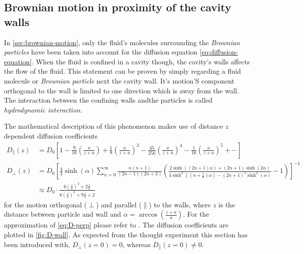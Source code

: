 \documentclass[.../bericht]{subfilies}
\begin{document}
      \subsection{Brownian motion in proximity of the cavity walls}
      \label{subsec:brownian-wall}

        In \cref{sec:brownian-motion}, only the fluid's molecules surrounding the \textit{Brownian particles} have been taken into account for the diffusion equation \cref{eq:diffusion-equation}. When the fluid is confined in a cavity though, the cavity's walls affects the flow of the fluid. This statement can be proven by simply regarding a fluid molecule or \textit{Brownian particle} next the cavity wall. It's motion'S component orthogonal to the wall is limited to one direction which is away from the wall. The interaction between the confining walls andthe particles is called \textit{hydrodynamic interaction}.

        The mathematical description of this phenomenon makes use of distance $z$ dependent diffusion coefficients
        \begin{align}
          D_\parallel(z)&=D_0\left[ 1- \frac{9}{16} \left( \frac{a}{z+a}\right) + \frac{1}{8} \left( \frac{a}{z+a}\right)^3 - \frac{45}{256}\left( \frac{a}{z+a}\right)^4- \frac{1}{16}\left( \frac{a}{z+a}\right)^5+\cdots \right] \label{eq:D-parallel} \\
          D_\perp(z)&=D_0\left[ \frac{4}{3}\sinh (\alpha ) \sum_{n=0}^{\infty} \frac{n(n+1)}{(2n-1)(2n+3)}\left( \frac{2\sinh ((2n+1)\alpha )+(2n+1)\sinh (2\alpha )}{4\sinh^2 ((n+ \frac{1}{2})\alpha)-(2n+1)^2 \sinh^2 (\alpha )} - 1 \right) \right]^{-1} \nonumber \\
          &\approx D_0\cdot \frac{6 \left( \frac{z}{a}\right)^2 + 2 \frac{z}{a}}{6\left( \frac{z}{a}\right)^2 + 9 \frac{z}{a} + 2} \label{eq:D-perp}
        \end{align}
         for the motion orthogonal ($\perp$) and parallel ($\parallel$) to the walls, where $z$ is the distance between particle and wall and $\alpha=\arccos \left( \frac{z+a}{a} \right)$. For the approximation of \cref{eq:D-perp} please refer to \cite{beavan}. The diffusion coefficients are plotted in \cref{fig:D-wall}. As expected from the thought experiment this section has been introduced with, $D_\perp (z=0)=0$, whereas $D_\parallel (z=0)\ne 0$. \cite{helden}
\end{document}
